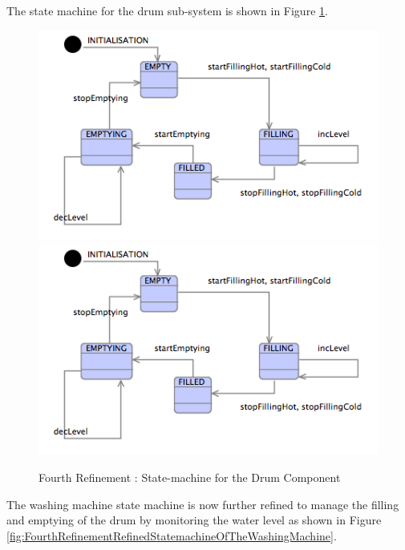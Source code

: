 The state machine for the drum sub-system is shown in Figure \ref{fig:FourthRefinementStatemachineForTheDrumComponent}.
 
 \begin{figure}[!htbp]
  \centering
  \ifplastex
  \includegraphics[width=1024]{figures/image42.png}
  \else
  \includegraphics[width=1\textwidth]{figures/image42.png}
  \fi
  \caption{Fourth Refinement : State-machine for the Drum Component}
  \label{fig:FourthRefinementStatemachineForTheDrumComponent}
\end{figure} 
 
The washing machine state machine is now further refined to manage the filling and emptying of the drum by monitoring the water level as shown in Figure \ref{fig:FourthRefinementRefinedStatemachineOfTheWashingMachine}.
 
